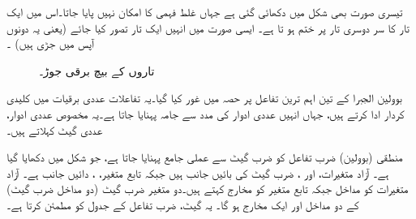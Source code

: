  تیسری صورت بھی شکل میں دکھائی گئی ہے جہاں غلط فہمی کا  امکان نہیں پایا جاتا۔اس میں ایک تار کا سر دوسری تار پر ختم ہو تا ہے۔ ایسی صورت میں انہیں ایک  تار تصور کیا جائے  (یعنی یہ دونوں آپس میں جڑی ہیں) ۔
\begin{figure}
\centering
{}\quad\quad
{}\quad \quad 
{}
\caption{تاروں کے بیچ برقی جوڑ۔}
\label{شکل_بوولین_برقی_تار_جوڑ}
\end{figure}

 بوولین الجبرا کے تین اہم ترین تفاعل پر حصہ  میں  غور  کیا گیا۔یہ  تفاعلات  عددی  برقیات  میں کلیدی کردار ادا کرتے ہیں، جہاں انہیں  عددی ادوار کی مدد سے جامہ   پہنایا  جاتا ہے۔یہ مخصوص عددی ادوار،  عددی گیٹ  کہلاتے ہیں۔
 
منطقی (بوولین)  ضرب   تفاعل کو   ضرب گیٹ سے  عملی جامع پہنایا  جاتا ہے،  جو شکل    میں دکھایا گیا ہے۔ آزاد متغیرات،    اور ،   ضرب گیٹ کی  بائیں جانب ہیں  جبکہ تابع متغیر، ،  دائیں جانب  ہے۔  آزاد متغیرات کو مداخل  جبکہ تابع متغیر  کو مخارج کہتے ہیں۔دو متغیر  ضرب گیٹ (دو مداخل ضرب  گیٹ)  کے دو مداخل اور ایک مخارج ہو   گا۔ یہ گیٹ،  ضرب تفاعل کے جدول  کو مطمئن کرتا ہے۔
	
